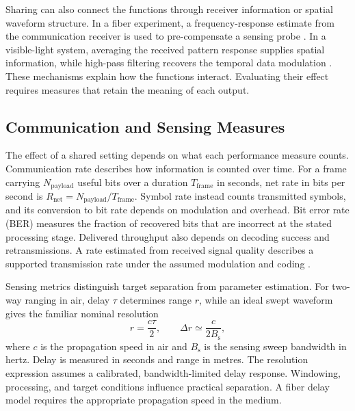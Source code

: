 Sharing can also connect the functions through receiver information or
spatial waveform structure. In a fiber experiment, a frequency-response
estimate from the communication receiver is used to pre-compensate a sensing
probe \cite{OISAC_SCR00057}. In a visible-light system, averaging the received
pattern response supplies spatial information, while high-pass filtering
recovers the temporal data modulation \cite{OISAC_SCR00196}.
These mechanisms explain how the functions interact. Evaluating their
effect requires measures that retain the meaning of each output.

\subsection{Communication and Sensing Measures}
\label{sec:communication_sensing_measures}

The effect of a shared setting depends on what each performance measure
counts. Communication rate describes how information is counted over time.
For a frame carrying $N_{\mathrm{payload}}$ useful bits over a duration
$T_{\mathrm{frame}}$ in seconds, net rate in bits per second is
$R_{\mathrm{net}}=N_{\mathrm{payload}}/T_{\mathrm{frame}}$.
Symbol rate instead counts transmitted symbols, and its conversion to bit
rate depends on modulation and overhead. Bit error rate (BER) measures the
fraction of recovered bits that are incorrect at the stated processing stage.
Delivered throughput also depends on decoding success and retransmissions.
A rate estimated from received signal quality describes a supported
transmission rate under the assumed modulation and coding
\cite{OISAC_SCR01054,OISAC_SCR01180,OISAC_SCR00196}.

Sensing metrics distinguish target separation from parameter estimation.
For two-way ranging in air, delay $\tau$ determines range $r$, while an
ideal swept waveform gives the familiar nominal resolution
\begin{equation}
r=\frac{c\tau}{2},
\qquad
\Delta r \simeq \frac{c}{2B_{\mathrm{s}}},
\label{eq:range_and_resolution}
\end{equation}
where $c$ is the propagation speed in air and $B_{\mathrm{s}}$ is the sensing
sweep bandwidth in hertz. Delay is measured in seconds and range in metres.
The resolution expression assumes a calibrated, bandwidth-limited delay
response. Windowing, processing, and target conditions influence practical
separation. A fiber delay model requires the appropriate propagation speed
in the medium.

